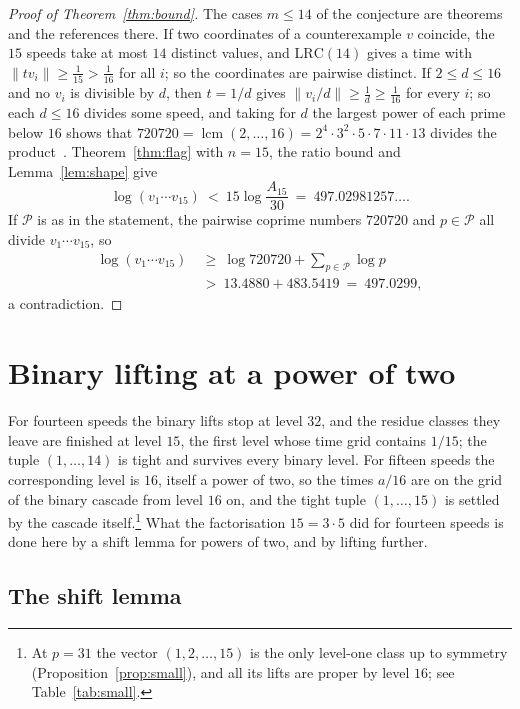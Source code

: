 \documentclass[aps,prd,twocolumn,superscriptaddress,nofootinbib,longbibliography,floatfix,showkeys,amsmath,amssymb,10pt]{revtex4-2}
\theoremstyle{definition}
\theoremstyle{remark}
\newcommand{\LRC}{\mathrm{LRC}}
\begin{document}
\begin{proof}[Proof of Theorem~\ref{thm:bound}]
The cases $m\le14$ of the conjecture are theorems~\cite{All26} and the
references there. If two coordinates of a counterexample $v$ coincide, the
$15$ speeds take at most $14$ distinct values, and $\LRC(14)$ gives a time
with $\|tv_i\|\ge\frac1{15}>\frac1{16}$ for all $i$; so the coordinates are
pairwise distinct. If $2\le d\le16$ and no $v_i$ is divisible by $d$, then
$t=1/d$ gives $\|v_i/d\|\ge\frac1d\ge\frac1{16}$ for every $i$; so each
$d\le16$ divides some speed, and taking for $d$ the largest power of each
prime below $16$ shows that
$720720=\operatorname{lcm}(2,\dots,16)=2^4\cdot3^2\cdot5\cdot7\cdot11\cdot13$
divides the product~\cite[Lemma~4]{Ros26a}. Theorem~\ref{thm:flag} with
$n=15$, the ratio bound and Lemma~\ref{lem:shape} give
\[
 \log(v_1\cdots v_{15})\ <\ 15\log\frac{A_{15}}{30}\ =\ 497.02981257\ldots .
\]
If $\mathcal P$ is as in the statement, the pairwise coprime numbers
$720720$ and $p\in\mathcal P$ all divide $v_1\cdots v_{15}$, so
\begin{align*}
 \log(v_1\cdots v_{15})&\ \ge\ \log720720+\sum_{p\in\mathcal P}\log p\\
 &\ >\ 13.4880+483.5419\ =\ 497.0299 ,
\end{align*}
a contradiction.
\end{proof}

\section{Binary lifting at a power of two}\label{sec:binary}

For fourteen speeds the binary lifts stop at level $32$, and the residue
classes they leave are finished at level $15$, the first level whose time grid
contains $1/15$; the tuple $(1,\dots,14)$ is tight and survives every binary
level. For fifteen speeds the corresponding level is $16$, itself a power of
two, so the times $a/16$ are on the grid of the binary cascade from level
$16$ on, and the tight tuple $(1,\dots,15)$ is settled by the cascade
itself.\footnote{At $p=31$ the vector $(1,2,\dots,15)$ is the only level-one
class up to symmetry (Proposition~\ref{prop:small}), and all its lifts are
proper by level $16$; see Table~\ref{tab:small}.} What the factorisation
$15=3\cdot5$ did for fourteen speeds is done here by a shift lemma for powers
of two, and by lifting further.

\subsection{The shift lemma}
\end{document}

